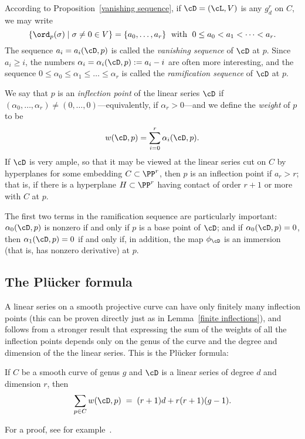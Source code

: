 According to  Proposition~\ref{vanishing sequence}, if $\cD = (\cL, V)$ is any $g^r_d$ on $C$, we may write
$$
\{ \ord_p(\sigma) \mid \sigma \neq 0 \in V \} = \{a_0,\dots,a_r\} \; \text{ with } \; 0\leq a_0 < a_1 < \dots < a_r.
$$
The sequence $a_i = a_i(\cD,p)$ is called the \emph{vanishing sequence} of $\cD$ at $p$.  Since $a_i \geq i$, the numbers $\alpha_i = \alpha_i(\cD,p) := a_i - i$ are often more interesting, and the sequence $0 \leq \alpha_0 \leq \alpha_1 \leq \dots \leq \alpha_r$ is called the \emph{ramification sequence} of $\cD$ at $p$. 

We say that $p$ is an \emph{inflection point} of the linear series $\cD$ if $(\alpha_0,\dots,\alpha_r) \neq (0,\dots,0)$---equivalently, if $\alpha_r > 0$---and we define the \emph{weight} of $p$ to be
$$
w(\cD, p) = \sum_{i=0}^r \alpha_i(\cD, p).
$$
If $\cD$ is very ample, so that it may be viewed at the linear series cut on $C$ by hyperplanes for some embedding $C \subset \PP^r$, then $p$ is an inflection point if $a_r > r$; that is, if there is a hyperplane $H \subset \PP^r$ having contact of order $r+1$ or more with $C$ at $p$. 

The first two terms in the ramification sequence are particularly important: $\alpha_0(\cD, p)$ is nonzero if and only if $p$ is a base point of $\cD$; and if $\alpha_0(\cD, p)=0$, then $\alpha_1(\cD, p) = 0$ if and only if, in addition, the map $\phi_\cD$ is an immersion (that is, has nonzero derivative) at $p$.


\subsection{The Pl\"ucker formula}

A linear series on a smooth projective curve can have only finitely many inflection points (this can be proven
directly just as in Lemma~\ref{finite inflections}), and follows from a stronger result that expressing the sum of the weights of all the inflection points depends only on the genus of the curve and the degree and dimension of the the linear series. This is the Pl\"ucker formula:

\begin{theorem}\label{Plucker}
If $C$ be a smooth curve of genus $g$ and $\cD$ is a
linear series of degree $d$ and dimension $r$, then
 \begin{equation}\label{Plucker formula}
\sum_{p \in C} w(\cD, p) \; = \; (r+1)d + r(r+1)(g-1).
\end{equation}
\end{theorem}
For a proof, see for example~\cite[Theorem 7.13]{allthat}.

